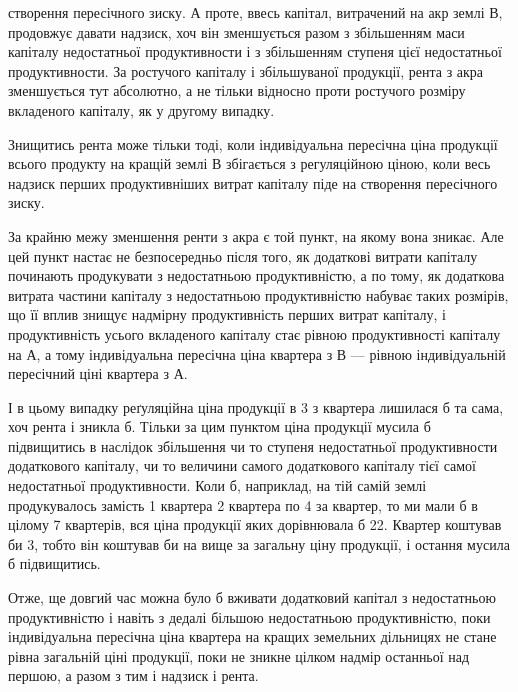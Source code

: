 \parcont{}  %
створення пересічного зиску. А проте, ввесь капітал, витрачений на акр землі $В$,
продовжує давати надзиск, хоч він зменшується разом з збільшенням маси капіталу
недостатньої продуктивности і з збільшенням ступеня цієї недостатньої
продуктивности. За ростучого капіталу і збільшуваної продукції, рента з акра
зменшується тут абсолютно, а не тільки відносно проти ростучого розміру вкладеного
капіталу, як у другому випадку.

Знищитись рента може тільки тоді, коли індивідуальна пересічна ціна
продукції всього продукту на кращій землі $В$ збігається з регуляційною ціною,
коли весь надзиск перших продуктивніших витрат капіталу піде на створення
пересічного зиску.

За крайню межу зменшення ренти з акра є той пункт, на якому вона
зникає. Але цей пункт настає не безпосередньо після того, як додаткові витрати
капіталу починають продукувати з недостатньою продуктивністю, а по тому, як
додаткова витрата частини капіталу з недостатньою продуктивністю набуває таких
розмірів, що її вплив знищує надмірну продуктивність перших витрат капіталу,
і продуктивність усього вкладеного капіталу стає рівною продуктивності капіталу
на $А$, а тому індивідуальна пересічна ціна квартера з $В$ — рівною індивідуальній
пересічний ціні квартера з $А$.

І в цьому випадку реґуляційна ціна продукції в 3 з квартера
лишилася б та сама, хоч рента і зникла б. Тільки за цим пунктом ціна продукції
мусила б підвищитись в наслідок збільшення чи то ступеня недостатньої
продуктивности додаткового капіталу, чи то величини самого додаткового
капіталу тієї самої недостатньої продуктивности. Коли б, наприклад,
на тій самій землі продукувалось замість 1 квартера 2 квартера
по 4 за квартер, то ми мали б в цілому 7 квартерів, вся ціна
продукції яких дорівнювала б 22. Квартер коштував би 3,
тобто він коштував би на  вище за загальну ціну продукції, і остання
мусила б підвищитись.

Отже, ще довгий час можна було б вживати додатковий капітал з недостатньою
продуктивністю і навіть з дедалі більшою недостатньою продуктивністю,
поки індивідуальна пересічна ціна квартера на кращих земельних дільницях
не стане рівна загальній ціні продукції, поки не зникне цілком надмір останньої
над першою, а разом з тим і надзиск і рента.

